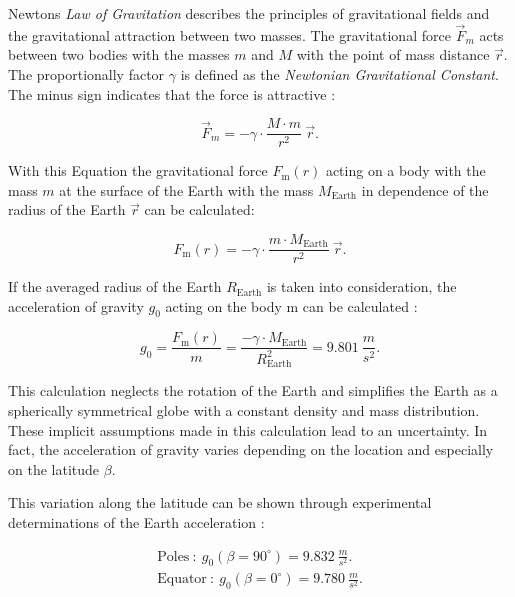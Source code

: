 Newtons \textit{Law of Gravitation} describes the principles of gravitational fields and the gravitational attraction between two masses. The gravitational force $ \vec{F}_{m} $ acts between two bodies with the masses $m$ and $M$ with the point of mass distance $\vec{r}$. The proportionally factor $\gamma$ is defined as the \textit{Newtonian Gravitational Constant}. The minus sign indicates that the force is attractive \cite{Demtroder.2017}:

\begin{equation}
\vec{F}_{m} = -\gamma \cdot \frac{M \cdot m}{r^{2}} \ \vec{r}.
\label{eqn:LawOfGravity}
\end{equation}

With this Equation the gravitational force $F_\text{m}(r)$ acting on a body with the mass $m$ at the surface of the Earth with the mass $M_\text{Earth}$ in dependence of the radius of the Earth $\vec{r}$ can be calculated:

\begin{equation}
F_\text{m}(r) = -\gamma \cdot \frac{m \cdot M_\text{Earth}}{r^{2}} \ \vec{r}.
\label{eqn:LawOfGravity2}
\end{equation}

If the averaged radius of the Earth $R_\text{Earth}$ is taken into consideration, the acceleration of gravity $g_\text{0}$ acting on the body m can be calculated \cite{Messerschmid.2017}:

\begin{equation}
g_0 = \frac{F_\text{m}(r)}{m} = \frac{-\gamma \cdot M_\text{Earth}}{R_\text{Earth}^{2}} = 9.801 \ \frac{m}{s^{2}}.
\label{eqn:LawOfGravity3}
\end{equation}



This calculation neglects the rotation of the Earth and simplifies the Earth as a spherically symmetrical globe with a constant density and mass distribution. These implicit assumptions made in this calculation lead to an uncertainty. In fact, the acceleration of gravity varies depending on the location and especially on the latitude $\beta$.

This variation along the latitude can be shown through experimental determinations of the Earth acceleration \cite{Demtroder.2017}:

\begin{equation}
\begin{gathered}
\text{Poles} \ : \ g_\text{0}(\beta = 90 ^\circ) = 9.832 \ \frac{m}{s^{2}}. \\
\text{Equator} \ : \ g_\text{0}(\beta = 0 ^\circ) = 9.780 \ \frac{m}{s^{2}}.
\end{gathered}
\label{eqn:LawOfGravity5}
\end{equation}

